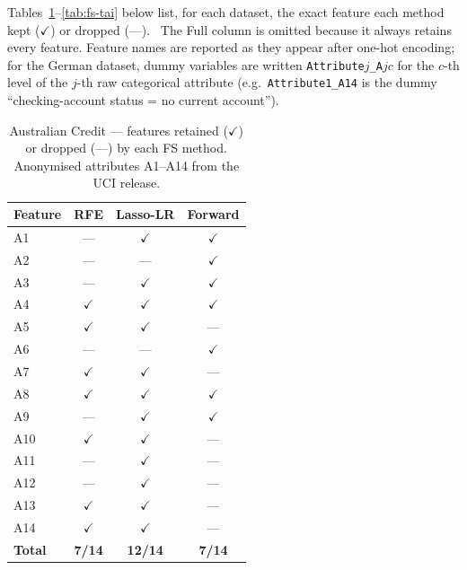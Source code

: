 Tables~\ref{tab:fs-aus}--\ref{tab:fs-tai} below list, for each
dataset, the exact feature each method kept ($\checkmark$) or
dropped (---). \ The Full column is omitted because it always
retains every feature.  Feature names are reported as they appear
after one-hot encoding; for the German dataset, dummy variables
are written \texttt{Attribute$j$\_A$jc$} for the $c$-th level of the
$j$-th raw categorical attribute (e.g.\ \texttt{Attribute1\_A14} is
the dummy ``checking-account status = no current account'').

\begin{table}[H]
\centering
\caption{Australian Credit --- features retained ($\checkmark$) or
dropped (---) by each FS method.  Anonymised attributes
A1--A14 from the UCI release.}
\singlespacing
\label{tab:fs-aus}
\small
\begin{tabular}{l c c c}
\toprule
\textbf{Feature} & \textbf{RFE} & \textbf{Lasso-LR} & \textbf{Forward}\\
\midrule
A1  & ---          & $\checkmark$ & $\checkmark$\\
A2  & ---          & ---          & $\checkmark$\\
A3  & ---          & $\checkmark$ & $\checkmark$\\
A4  & $\checkmark$ & $\checkmark$ & $\checkmark$\\
A5  & $\checkmark$ & $\checkmark$ & ---\\
A6  & ---          & ---          & $\checkmark$\\
A7  & $\checkmark$ & $\checkmark$ & ---\\
A8  & $\checkmark$ & $\checkmark$ & $\checkmark$\\
A9  & ---          & $\checkmark$ & $\checkmark$\\
A10 & $\checkmark$ & $\checkmark$ & ---\\
A11 & ---          & $\checkmark$ & ---\\
A12 & ---          & $\checkmark$ & ---\\
A13 & $\checkmark$ & $\checkmark$ & ---\\
A14 & $\checkmark$ & $\checkmark$ & ---\\
\midrule
\textbf{Total} & \textbf{7/14} & \textbf{12/14} & \textbf{7/14}\\
\bottomrule
\end{tabular}
\end{table}

